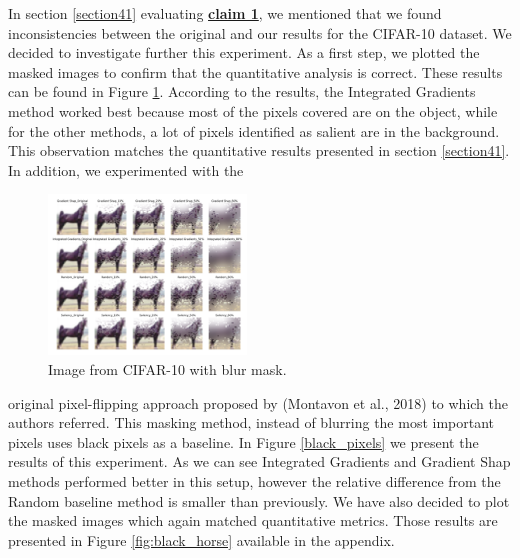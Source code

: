 In section \ref{section41} evaluating \textbf{\hyperref[claim1]{claim 1}}, we mentioned that we found inconsistencies between the original and our results for the CIFAR-10 dataset. We decided to investigate further this experiment. As a first step, we plotted the masked images to confirm that the quantitative analysis is correct. These results can be found in Figure \ref{fig:blurred_horse}. According to the results, the Integrated Gradients method worked best because most of the pixels covered are on the object, while for the other methods, a lot of pixels identified as salient are in the background. This observation matches the quantitative results presented in section \ref{section41}. In addition, we experimented with the \begin{figure}
    \centering
    \includegraphics[width=0.47\textwidth]{images/blurred horse.png}
    \caption{Image from CIFAR-10 with blur mask.}
    \label{fig:blurred_horse}
\end{figure} original pixel-flipping approach proposed by (Montavon et al., 2018)\cite{Montavon} to which the authors referred. This masking method, instead of blurring the most important pixels uses black pixels as a baseline. In Figure \ref{black_pixels} we present the results of this experiment. As we can see Integrated Gradients and Gradient Shap methods performed better in this setup, however the relative difference from the Random baseline method is smaller than previously. We have also decided to plot the masked images which again matched quantitative metrics. Those results are presented in Figure \ref{fig:black_horse} available in the appendix.




